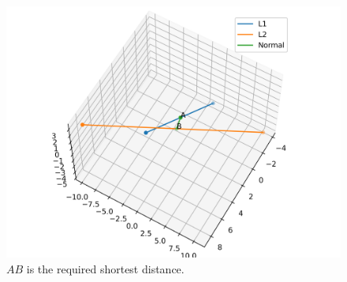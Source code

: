 \documentclass[journal,12pt,twocolumn]{IEEEtran}
\begin{document}
\begin{enumerate}
\begin{enumerate}
\begin{figure}[!ht]
\centering
\includegraphics[width=\columnwidth]{./figs/skew.png}
\caption{$AB$ is the required shortest distance.}
\end{figure}
\end{enumerate} 
\end{enumerate}
\end{document}

